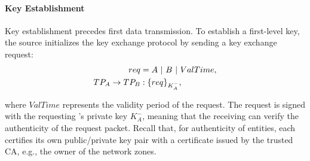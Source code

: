 

\paragraph{Key Establishment}
Key establishment precedes first data transmission. To establish a first-level key,
the source \tp initializes the key exchange protocol by sending a key exchange request:
\noindent
\begin{subequations}
	\begin{align}
		req                     & = A~|~B~|~ValTime, \\
		TP_A \rightarrow TP_B & : \{req\}_{K^-_A},
	\end{align}
	\label{eq:req}
\end{subequations}

\noindent
where $ValTime$ represents the validity period of the request. The request is signed with
the requesting \tp's private key ${K^-_A}$, meaning that the receiving \tp can verify the
authenticity of the request packet. Recall that, for authenticity of \name entities, each
\tp certifies its own public/private key pair with a certificate issued by the trusted CA,
e.g., the owner of the network zones.

